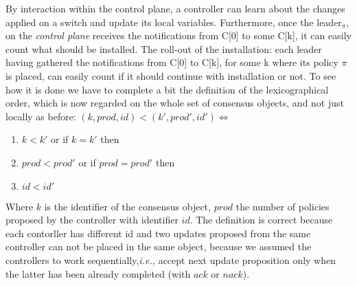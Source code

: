\documentclass{article}
\begin{document}
 By interaction within the control plane, a controller can learn about the changes applied on a switch and update its local variables. Furthermore, once the leader$_\pi$, on the \emph{control plane} receives the notifications from C[0] to some C[k], it can easily count what should be installed.%
  The roll-out of the installation: each leader having gathered the notifications from C[0] to C[k], for some k where its policy $\pi$ is placed, can easily count if it should continue with installation or not.
To see how it is done we have to complete a bit the definition of the lexicographical order, which is now regarded on the whole set of consensus objects, and not just locally as before:
$(k,prod,id)<(k',prod',id') \Leftrightarrow $
\begin{enumerate}
\item $k<k'$ or if $k=k'$ then 
\item $prod<prod'$ or if $prod=prod'$ then
\item $id<id'$
\end{enumerate}
Where $k$ is the identifier of the consensus object, $prod$ the number of policies proposed by the controller with identifier $id$. The definition is correct because each contorller has different id and two updates proposed from the same controller can not be placed in the same object, because we assumed the controllers to work sequentially,\emph{i.e.,} accept next update proposition only when the latter has been already completed (with $ack$ or $nack$).
%
\end{document}
